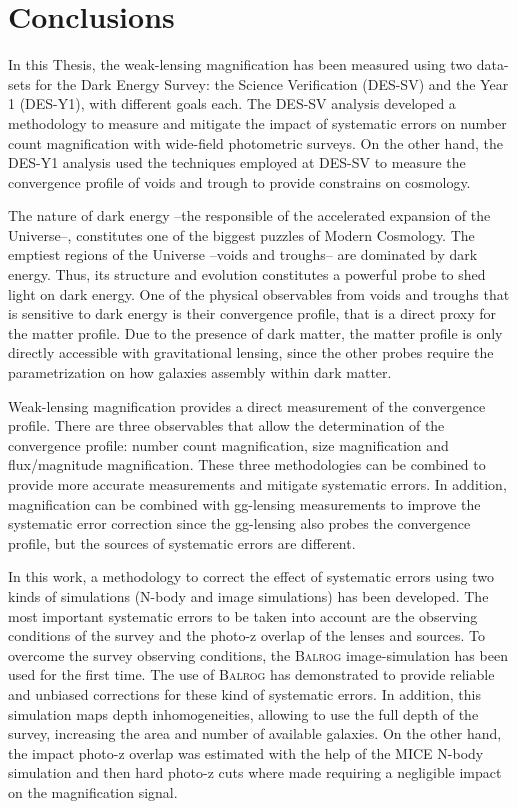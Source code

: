 \chapter{Conclusions}
\label{ch:conclusions}
In this Thesis, the weak-lensing magnification has been measured using two data-sets for the Dark Energy Survey: the Science Verification (DES-SV) and the Year 1 (DES-Y1), with different goals each. The DES-SV analysis developed a methodology to measure and mitigate the impact of systematic errors on number count magnification with wide-field photometric surveys. On the other hand, the DES-Y1 analysis used the techniques employed at DES-SV to measure the convergence profile of voids and trough to provide constrains on cosmology.
\newline

The nature of dark energy --the responsible of the accelerated expansion of the Universe--, constitutes one of the biggest puzzles of Modern Cosmology. The emptiest regions of the Universe --voids and troughs-- are dominated by dark energy. Thus, its structure and evolution constitutes a powerful probe to shed light on dark energy. One of the physical observables from voids and troughs that is sensitive to dark energy is their convergence profile, that is a direct proxy for the matter profile. Due to the presence of dark matter, the matter profile is only directly accessible with gravitational lensing, since the other probes require the parametrization on how galaxies assembly within dark matter.
\newline

Weak-lensing magnification provides a direct measurement of the convergence profile. There are three observables that allow the determination of the convergence profile: number count magnification, size magnification and flux/magnitude magnification. These three methodologies can be combined to provide more accurate measurements and mitigate systematic errors. In addition, magnification can be combined with gg-lensing measurements to improve the systematic error correction since the gg-lensing also probes the convergence profile, but the sources of systematic errors are different.
\newline

In this work, a methodology to correct the effect of systematic errors using two kinds of simulations (N-body and image simulations) has been developed. The most important systematic errors to be taken into account are the observing conditions of the survey and the photo-z overlap of the lenses and sources. To overcome the survey observing conditions, the {\scshape Balrog} image-simulation has been used for the first time. The use of {\scshape Balrog} has demonstrated to provide reliable and unbiased corrections for these kind of systematic errors. In addition, this simulation maps depth inhomogeneities, allowing to use the full depth of the survey, increasing the area and number of available galaxies. On the other hand, the impact photo-z overlap was estimated with the help of the MICE N-body simulation and then hard photo-z cuts where made requiring a negligible impact on the magnification signal.
\newline

